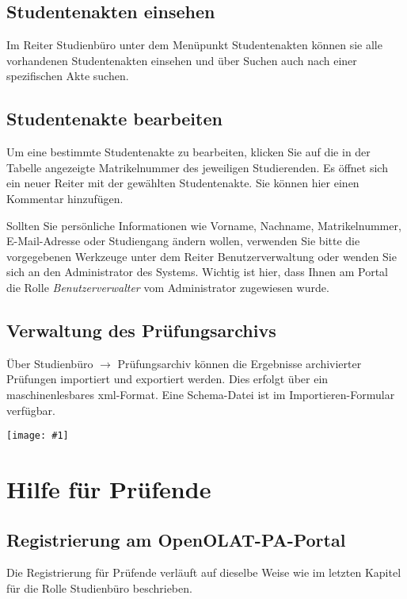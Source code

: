 \documentclass[a4paper,11pt]{article}
\newcommand{\bild}[1]{
    \begin{center}\texttt{[image: \#1]}\end{center}
}
\newcommand{\knopf}[1]{{\sc #1}}
\begin{document}
\subsection{Studentenakten einsehen}

Im Reiter \knopf{Studienbüro} unter dem Menüpunkt \knopf{Studentenakten}
können sie alle vorhandenen Studentenakten einsehen und über
\knopf{Suchen} auch nach einer spezifischen Akte suchen.

\subsection{Studentenakte bearbeiten}

Um eine bestimmte Studentenakte zu bearbeiten, klicken Sie auf
die in der Tabelle angezeigte Matrikelnummer des jeweiligen Studierenden.
Es öffnet sich ein neuer Reiter mit der gewählten Studentenakte.
Sie können hier einen \knopf{Kommentar hinzufügen}.

Sollten Sie persönliche Informationen wie Vorname, Nachname,
Matrikelnummer, E-Mail-Adresse oder Studiengang ändern wollen, verwenden Sie
bitte die vorgegebenen Werkzeuge unter dem Reiter \knopf{Benutzerverwaltung}
oder wenden Sie sich an den Administrator des Systems. Wichtig ist hier, dass
Ihnen am Portal die Rolle {\em Benutzerverwalter} vom Administrator zugewiesen wurde.

\subsection{Verwaltung des Prüfungsarchivs}

Über \knopf{Studienbüro $\rightarrow$ Prüfungsarchiv} können die Ergebnisse
archivierter Prüfungen importiert und exportiert werden. Dies erfolgt über ein
maschinenlesbares xml-Format. Eine Schema-Datei ist im Importieren-Formular
verfügbar.

\bild{archive}

\clearpage
\section{Hilfe für Prüfende}

\subsection{Registrierung am OpenOLAT-PA-Portal}

Die Registrierung für Prüfende verläuft auf dieselbe Weise wie im letzten
Kapitel für die Rolle Studienbüro beschrieben.
\end{document}
